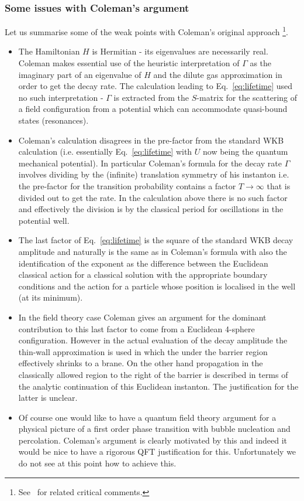 \documentclass[a4paper,11pt]{article}
\numberwithin{equation}{section}
\begin{document}
\subsubsection*{Some issues with Coleman's argument}
Let us summarise some of the weak points with Coleman's original approach \footnote{See~\cite{Andreassen:2016cvx} for related critical comments.}.
\begin{itemize}
\item The Hamiltonian $H$ is Hermitian - its eigenvalues are necessarily real. Coleman makes essential use of the heuristic interpretation of $\Gamma$ as the imaginary part of an eigenvalue of $ H$ and the dilute gas approximation in order to get the decay rate. The calculation leading to Eq.~\eqref{eq:lifetime} used no such interpretation - $\Gamma$ is extracted from the $S$-matrix for the scattering of a field configuration from a potential which can accommodate quasi-bound states (resonances).
\item Coleman's calculation disagrees in the pre-factor from the standard WKB calculation (i.e. essentially Eq.~\eqref{eq:lifetime} with $U$ now being the quantum mechanical potential). In particular Coleman's formula for the decay rate $\Gamma$ involves dividing by the (infinite) translation symmetry of his instanton i.e. the pre-factor for the transition probability contains a factor $T\rightarrow\infty$ that is divided out to get the rate. In the calculation above there is no such factor and effectively the division is by the classical period for oscillations in the potential well.
\item The last factor of Eq.~\eqref{eq:lifetime} is the square of the standard WKB decay amplitude and naturally is the same as in Coleman's formula with also the identification of the exponent as the difference between the Euclidean classical action for a classical solution with the appropriate boundary conditions and the action for a particle whose position is localised in the well (at its minimum). 
\item In the field theory case Coleman gives an argument for the dominant contribution to this last factor to come from a Euclidean 4-sphere configuration. However in the actual evaluation of the decay amplitude the thin-wall approximation is used in which the under the barrier region effectively shrinks to a brane. On the other hand propagation in the classically allowed region to the right of the barrier is described in terms of the analytic continuation of this Euclidean instanton. The justification for the latter is unclear.
\item Of course one would like to have a quantum field theory argument for a physical picture of a first order phase transition with bubble nucleation and percolation. Coleman's argument is clearly motivated by this and indeed it would be nice to have a rigorous QFT justification for this. Unfortunately we do not see at this point how to achieve this.
\end{itemize}
\end{document}

